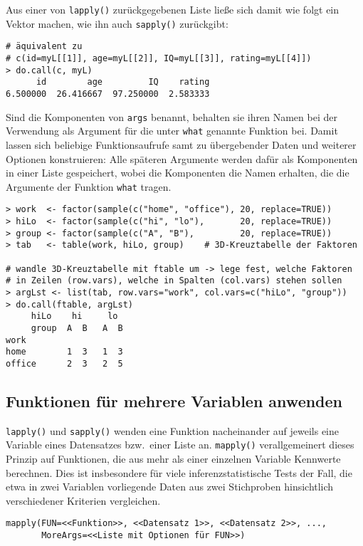 Aus einer von \lstinline!lapply()! zurückgegebenen Liste ließe sich damit wie folgt ein Vektor machen, wie ihn auch \lstinline!sapply()! zurückgibt:
\begin{lstlisting}
# äquivalent zu
# c(id=myL[[1]], age=myL[[2]], IQ=myL[[3]], rating=myL[[4]])
> do.call(c, myL)
      id        age         IQ    rating
6.500000  26.416667  97.250000  2.583333
\end{lstlisting}

Sind die Komponenten von \lstinline!args! benannt, behalten sie ihren Namen bei der Verwendung als Argument für die unter \lstinline!what! genannte Funktion bei. Damit lassen sich beliebige Funktionsaufrufe samt zu übergebender Daten und weiterer Optionen konstruieren: Alle späteren Argumente werden dafür als Komponenten in einer Liste gespeichert, wobei die Komponenten die Namen erhalten, die die Argumente der Funktion \lstinline!what! tragen.
\begin{lstlisting}
> work  <- factor(sample(c("home", "office"), 20, replace=TRUE))
> hiLo  <- factor(sample(c("hi", "lo"),       20, replace=TRUE))
> group <- factor(sample(c("A", "B"),         20, replace=TRUE))
> tab   <- table(work, hiLo, group)    # 3D-Kreuztabelle der Faktoren

# wandle 3D-Kreuztabelle mit ftable um -> lege fest, welche Faktoren
# in Zeilen (row.vars), welche in Spalten (col.vars) stehen sollen
> argLst <- list(tab, row.vars="work", col.vars=c("hiLo", "group"))
> do.call(ftable, argLst)
     hiLo    hi     lo
     group  A  B   A  B
work
home        1  3   1  3
office      2  3   2  5
\end{lstlisting}

\subsection{Funktionen für mehrere Variablen anwenden}

\lstinline!lapply()! und \lstinline!sapply()! wenden eine Funktion nacheinander auf jeweils eine Variable eines Datensatzes bzw.\ einer Liste an. \lstinline!mapply()! verallgemeinert dieses Prinzip auf Funktionen, die aus mehr als einer einzelnen Variable Kennwerte berechnen. Dies ist insbesondere für viele inferenzstatistische Tests der Fall, die etwa in zwei Variablen vorliegende Daten aus zwei Stichproben hinsichtlich verschiedener Kriterien vergleichen.
\begin{lstlisting}
mapply(FUN=<<Funktion>>, <<Datensatz 1>>, <<Datensatz 2>>, ...,
       MoreArgs=<<Liste mit Optionen für FUN>>)
\end{lstlisting}

